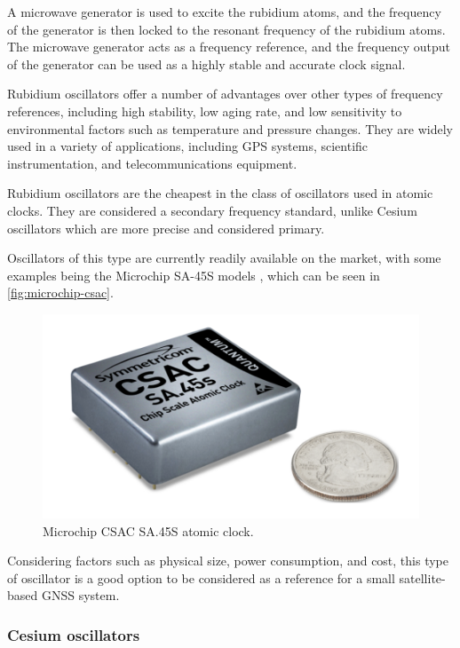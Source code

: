 A microwave generator is used to excite the rubidium atoms, and the frequency of the generator is then locked to the resonant frequency of the rubidium atoms. The microwave generator acts as a frequency reference, and the frequency output of the generator can be used as a highly stable and accurate clock signal.

Rubidium oscillators offer a number of advantages over other types of frequency references, including high stability, low aging rate, and low sensitivity to environmental factors such as temperature and pressure changes. They are widely used in a variety of applications, including GPS systems, scientific instrumentation, and telecommunications equipment.

Rubidium oscillators are the cheapest in the class of oscillators used in atomic clocks. They are considered a secondary frequency standard, unlike Cesium oscillators which are more precise and considered primary.

Oscillators of this type are currently readily available on the market, with some examples being the Microchip SA-45S models \cite{sa45s}, which can be seen in \autoref{fig:microchip-csac}.

\begin{figure}[!ht]
    \begin{center}
        \includegraphics[width=0.7\columnwidth]{figures/microchip-csac}
        \caption{Microchip CSAC SA.45S atomic clock.}
        \label{fig:microchip-csac}
    \end{center}
\end{figure}

Considering factors such as physical size, power consumption, and cost, this type of oscillator is a good option to be considered as a reference for a small satellite-based GNSS system.

\subsubsection{Cesium oscillators}

